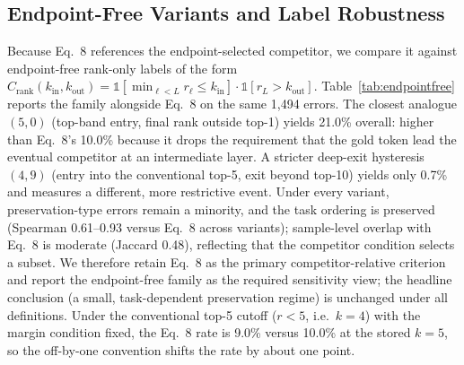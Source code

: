 \documentclass{article} %
\begin{document}
\subsection{Endpoint-Free Variants and Label Robustness}
\label{sec:endpointfree}
Because Eq.~8 references the endpoint-selected competitor, we compare it against endpoint-free rank-only labels of the form $C_{\mathrm{rank}}(k_{\mathrm{in}}, k_{\mathrm{out}})=\mathbb{1}[\min_{\ell<L}r_\ell\le k_{\mathrm{in}}]\cdot\mathbb{1}[r_L>k_{\mathrm{out}}]$. Table~\ref{tab:endpointfree} reports the family alongside Eq.~8 on the same 1{,}494 errors. The closest analogue $(5,0)$ (top-band entry, final rank outside top-1) yields 21.0\% overall: higher than Eq.~8's 10.0\% because it drops the requirement that the gold token lead the eventual competitor at an intermediate layer. A stricter deep-exit hysteresis $(4,9)$ (entry into the conventional top-5, exit beyond top-10) yields only 0.7\% and measures a different, more restrictive event. Under every variant, preservation-type errors remain a minority, and the task ordering is preserved (Spearman 0.61--0.93 versus Eq.~8 across variants); sample-level overlap with Eq.~8 is moderate (Jaccard 0.48), reflecting that the competitor condition selects a subset. We therefore retain Eq.~8 as the primary competitor-relative criterion and report the endpoint-free family as the required sensitivity view; the headline conclusion (a small, task-dependent preservation regime) is unchanged under all definitions. Under the conventional top-5 cutoff ($r<5$, i.e.\ $k{=}4$) with the margin condition fixed, the Eq.~8 rate is 9.0\% versus 10.0\% at the stored $k{=}5$, so the off-by-one convention shifts the rate by about one point.
\end{document}
